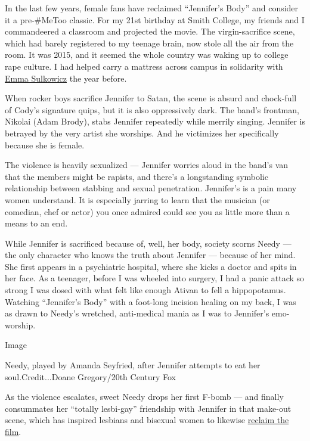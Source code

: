 In the last few years, female fans have reclaimed ``Jennifer's Body''
and consider it a pre-\#MeToo classic. For my 21st birthday at Smith
College, my friends and I commandeered a classroom and projected the
movie. The virgin-sacrifice scene, which had barely registered to my
teenage brain, now stole all the air from the room. It was 2015, and it
seemed the whole country was waking up to college rape culture. I had
helped carry a mattress across campus in solidarity with
\href{https://www.nytimes.com/2014/09/22/arts/design/in-a-mattress-a-fulcrum-of-art-and-political-protest.html?searchResultPosition=8}{Emma
Sulkowicz} the year before.

When rocker boys sacrifice Jennifer to Satan, the scene is absurd and
chock-full of Cody's signature quips, but it is also oppressively dark.
The band's frontman, Nikolai (Adam Brody), stabs Jennifer repeatedly
while merrily singing. Jennifer is betrayed by the very artist she
worships. And he victimizes her specifically because she is female.

The violence is heavily sexualized --- Jennifer worries aloud in the
band's van that the members might be rapists, and there's a longstanding
symbolic relationship between stabbing and sexual penetration.
Jennifer's is a pain many women understand. It is especially jarring to
learn that the musician (or comedian, chef or actor) you once admired
could see you as little more than a means to an end.

While Jennifer is sacrificed because of, well, her body, society scorns
Needy --- the only character who knows the truth about Jennifer ---
because of her mind. She first appears in a psychiatric hospital, where
she kicks a doctor and spits in her face. As a teenager, before I was
wheeled into surgery, I had a panic attack so strong I was dosed with
what felt like enough Ativan to fell a hippopotamus. Watching
``Jennifer's Body'' with a foot-long incision healing on my back, I was
as drawn to Needy's wretched, anti-medical mania as I was to Jennifer's
emo-worship.

Image

Needy, played by Amanda Seyfried, after Jennifer attempts to eat her
soul.Credit...Doane Gregory/20th Century Fox

As the violence escalates, sweet Needy drops her first F-bomb --- and
finally consummates her ``totally lesbi-gay'' friendship with Jennifer
in that make-out scene, which has inspired lesbians and bisexual women
to likewise
\href{https://www.them.us/story/jennifers-body-film-cult-status}{reclaim
the film}.

